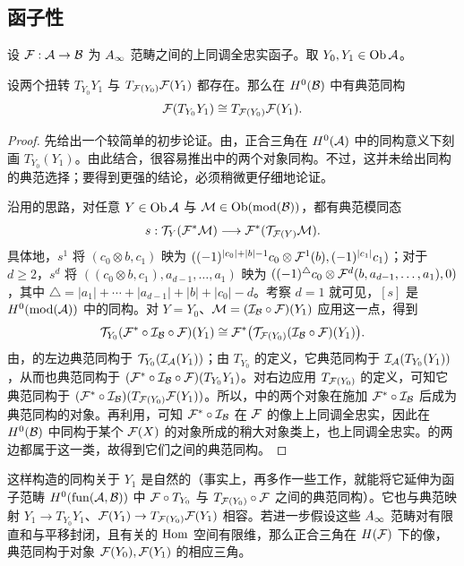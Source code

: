 \subsection{函子性}\label{sec:5d}
设 $\mathcal F:\mathcal A\to\mathcal B$ 为 $A_\infty$ 范畴之间的上同调全忠实函子。取 $Y_0,Y_1\in\operatorname{Ob}\mathcal A$。
\begin{lemma}\label{st:5.6}
设两个扭转 $T_{Y_0}Y_1$ 与 $T_{\mathcal F(Y_0)}\mathcal F(Y_1)$ 都存在。那么在 $H^0(\mathcal B)$ 中有典范同构
\begin{equation}\label{eq:5.10}
\mathcal F(T_{Y_0}Y_1)\cong T_{\mathcal F(Y_0)}\mathcal F(Y_1).
\end{equation}
\end{lemma}
\begin{proof}
先给出一个较简单的初步论证。由，正合三角在 $H^0(\mathcal A)$ 中的同构意义下刻画 $T_{Y_0}(Y_1)$。由此结合，很容易推出中的两个对象同构。不过，这并未给出同构的典范选择；要得到更强的结论，必须稍微更仔细地论证。

沿用的思路，对任意 $Y\in\operatorname{Ob}\mathcal A$ 与 $\mathcal M\in\operatorname{Ob}(\operatorname{mod}(\mathcal B))$，都有典范模同态
\[
s:\mathcal T_Y(\mathcal F^*\mathcal M)\longrightarrow\mathcal F^*(\mathcal T_{\mathcal F(Y)}\mathcal M).
\]
具体地，$s^1$ 将 $(c_0\otimes b,c_1)$ 映为 $((-1)^{|c_0|+|b|-1}c_0\otimes\mathcal F^1(b),(-1)^{|c_1|}c_1)$；对于 $d\geq2$，$s^d$ 将 $((c_0\otimes b,c_1),a_{d-1},\ldots,a_1)$ 映为 $((-1)^{\triangle}c_0\otimes\mathcal F^d(b,a_{d-1},\ldots,a_1),0)$，其中 $\triangle=|a_1|+\cdots+|a_{d-1}|+|b|+|c_0|-d$。考察 $d=1$ 就可见，$[s]$ 是 $H^0(\operatorname{mod}(\mathcal A))$ 中的同构。对 $Y=Y_0$、$\mathcal M=(\mathcal I_{\mathcal B}\circ\mathcal F)(Y_1)$ 应用这一点，得到
\begin{equation}\label{eq:5.11}
\mathcal T_{Y_0}(\mathcal F^*\circ\mathcal I_{\mathcal B}\circ\mathcal F)(Y_1)
\cong\mathcal F^*\bigl(\mathcal T_{\mathcal F(Y_0)}(\mathcal I_{\mathcal B}\circ\mathcal F)(Y_1)\bigr).
\end{equation}
由，的左边典范同构于 $\mathcal T_{Y_0}(\mathcal I_{\mathcal A}(Y_1))$；由 $T_{Y_0}$ 的定义，它典范同构于 $\mathcal I_{\mathcal A}(T_{Y_0}(Y_1))$，从而也典范同构于 $(\mathcal F^*\circ\mathcal I_{\mathcal B}\circ\mathcal F)(T_{Y_0}Y_1)$。对右边应用 $T_{\mathcal F(Y_0)}$ 的定义，可知它典范同构于 $(\mathcal F^*\circ\mathcal I_{\mathcal B})(T_{\mathcal F(Y_0)}\mathcal F(Y_1))$。所以，中的两个对象在施加 $\mathcal F^*\circ\mathcal I_{\mathcal B}$ 后成为典范同构的对象。再利用，可知 $\mathcal F^*\circ\mathcal I_{\mathcal B}$ 在 $\mathcal F$ 的像上上同调全忠实，因此在 $H^0(\mathcal B)$ 中同构于某个 $\mathcal F(X)$ 的对象所成的稍大对象类上，也上同调全忠实。的两边都属于这一类，故得到它们之间的典范同构。
\end{proof}
这样构造的同构关于 $Y_1$ 是自然的（事实上，再多作一些工作，就能将它延伸为函子范畴 $H^0(\operatorname{fun}(\mathcal A,\mathcal B))$ 中 $\mathcal F\circ T_{Y_0}$ 与 $T_{\mathcal F(Y_0)}\circ\mathcal F$ 之间的典范同构）。它也与典范映射 $Y_1\to T_{Y_0}Y_1$、$\mathcal F(Y_1)\to T_{\mathcal F(Y_0)}\mathcal F(Y_1)$ 相容。若进一步假设这些 $A_\infty$ 范畴对有限直和与平移封闭，且有关的 $\operatorname{Hom}$ 空间有限维，那么正合三角在 $H(\mathcal F)$ 下的像，典范同构于对象 $\mathcal F(Y_0),\mathcal F(Y_1)$ 的相应三角。
